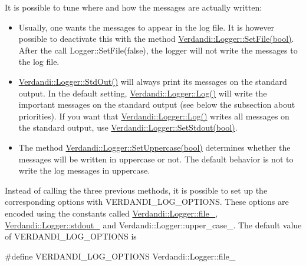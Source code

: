 \documentclass{tufte-book}
\begin{document}
\-It is possible to tune where and how the messages are actually written\-:
\begin{itemize}
\item \-Usually, one wants the messages to appear in the log file. \-It is however possible to deactivate this with the method {\ttfamily  \hyperlink{class_verdandi_1_1_logger_aadc9abee03cd90b049b625a8eda28367}{\-Verdandi\-::\-Logger\-::\-Set\-File(bool)}}. \-After the call {\ttfamily \-Logger\-::\-Set\-File(false)}, the logger will not write the messages to the log file.


\item {\ttfamily  \hyperlink{class_verdandi_1_1_logger_ad8110c7a55f37213bffae10a39f65035}{\-Verdandi\-::\-Logger\-::\-Std\-Out()}} will always print its messages on the standard output. \-In the default setting, {\ttfamily  \hyperlink{class_verdandi_1_1_logger_ab49f0d118882a7e67bb2e58239b5fafd}{\-Verdandi\-::\-Logger\-::\-Log()}} will write the important messages on the standard output (see below the subsection about priorities). \-If you want that {\ttfamily  \hyperlink{class_verdandi_1_1_logger_ab49f0d118882a7e67bb2e58239b5fafd}{\-Verdandi\-::\-Logger\-::\-Log()}} writes all messages on the standard output, use {\ttfamily  \hyperlink{class_verdandi_1_1_logger_aacc96eb406473ecc22e42c7f541f67c9}{\-Verdandi\-::\-Logger\-::\-Set\-Stdout(bool)}}.


\item \-The method {\ttfamily  \hyperlink{class_verdandi_1_1_logger_a26c0a873e610b7053c6f73db0bf3a03f}{\-Verdandi\-::\-Logger\-::\-Set\-Uppercase(bool)}} determines whether the messages will be written in uppercase or not. \-The default behavior is not to write the log messages in uppercase.
\end{itemize}

\-Instead of calling the three previous methods, it is possible to set up the corresponding options with {\ttfamily \-V\-E\-R\-D\-A\-N\-D\-I\-\_\-\-L\-O\-G\-\_\-\-O\-P\-T\-I\-O\-N\-S}. \-These options are encoded using the constants called {\ttfamily \hyperlink{class_verdandi_1_1_logger_afd551de4b9597d95a0d8c66f6773caf3}{\-Verdandi\-::\-Logger\-::file\-\_\-}}, {\ttfamily \hyperlink{class_verdandi_1_1_logger_a1f0c578e791f7a11f3b99192bfa237d3}{\-Verdandi\-::\-Logger\-::stdout\-\_\-}} and {\ttfamily \-Verdandi\-::\-Logger\-::upper\-\_\-case\-\_\-}. \-The default value of {\ttfamily \-V\-E\-R\-D\-A\-N\-D\-I\-\_\-\-L\-O\-G\-\_\-\-O\-P\-T\-I\-O\-N\-S} is
\begin{frame_cpp}
#define VERDANDI_LOG_OPTIONS Verdandi::Logger::file_
\end{frame_cpp}
\end{document}
